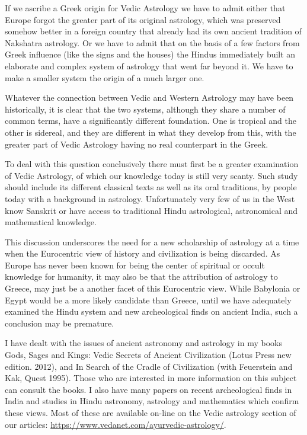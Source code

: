  

If we ascribe a Greek origin for Vedic Astrology we have to admit either that Europe forgot the greater part of its original astrology, which was preserved somehow better in a foreign country that already had its own ancient tradition of Nakshatra astrology. Or we have to admit that on the basis of a few factors from Greek influence (like the signs and the houses) the Hindus immediately built an elaborate and complex system of astrology that went far beyond it. We have to make a smaller system the origin of a much larger one.

 

Whatever the connection between Vedic and Western Astrology may have been historically, it is clear that the two systems, although they share a number of common terms, have a significantly different foundation. One is tropical and the other is sidereal, and they are different in what they develop from this, with the greater part of Vedic Astrology having no real counterpart in the Greek.

 

To deal with this question conclusively there must first be a greater examination of Vedic Astrology, of which our knowledge today is still very scanty. Such study should include its different classical texts as well as its oral traditions, by people today with a background in astrology. Unfortunately very few of us in the West know Sanskrit or have access to traditional Hindu astrological, astronomical and mathematical knowledge.

 

This discussion underscores the need for a new scholarship of astrology at a time when the Eurocentric view of history and civilization is being discarded. As Europe has never been known for being the center of spiritual or occult knowledge for humanity, it may also be that the attribution of astrology to Greece, may just be a another facet of this Eurocentric view. While Babylonia or Egypt would be a more likely candidate than Greece, until we have adequately examined the Hindu system and new archeological finds on ancient India, such a conclusion may be premature.

 

I have dealt with the issues of ancient astronomy and astrology in my books Gods, Sages and Kings: Vedic Secrets of Ancient Civilization (Lotus Press new edition. 2012), and In Search of the Cradle of Civilization (with Feuerstein and Kak, Quest 1995). Those who are interested in more information on this subject can consult the books. I also have many papers on recent archeological finds in India and studies in Hindu astronomy, astrology and mathematics which confirm these views. Most of these are available on-line on the Vedic astrology section of our articles:
\url{https://www.vedanet.com/ayurvedic-astrology/}.

